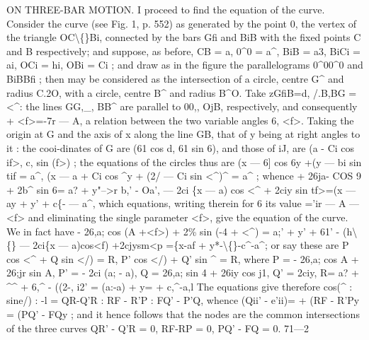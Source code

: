 \documentclass[12pt,a4paper]{article}
\begin{document}
ON THREE-BAR MOTION.
I proceed
to
find the equation of the
curve.
Consider
the
curve
(see
Fig.
1,
p. 552) as
generated by the point
0,
the vertex
of
the
triangle
OC\textbackslash\{\}Bi, connected by the
bars
Gfi and BiB with
the
fixed points C and B
respectively;
and
suppose,
as
before, CB = a,
0\textasciicircum{}0 = a\textasciicircum{},
BiB = a3,
BiCi = ai,
OCi = hi,
OBi = Ci
;
and
draw
as
in
the
figure
the
parallelograms
0\textasciicircum{}00\textasciicircum{}0
and BiBBfi
;
then
may
be
considered
as
the
intersection
of
a
circle,
centre
G\textasciicircum{}
and
radius
C.2O,
with
a
circle,
centre
B\textasciicircum{}
and
radius
B\textasciicircum{}O.
Take
zGfiB=d,
/.B,BG = <\textasciicircum{}:
the
lines
GG,\_,
BB\textasciicircum{}
are
parallel
to 00,,
OjB,
respectively, and consequently
+ <f>=-7r --- A, a
relation between
the two variable angles
6,
<f>.
Taking
the
origin
at G
and
the
axis
of
x
along
the
line
GB,
that
of y
being
at
right
angles
to
it
:
the
cooi-dinates
of
G\guillemotleft{}
are
(61 cos d,
61 sin 6),
and
those
of
iJ,
are (a - Ci cos
if>,
c, sin (f>)
;
the equations of the
circles thus are
(x --- 6] cos 6y
+(y --- bi sin tif = a\textasciicircum{},
(x --- a + Ci cos \textasciicircum{}y + (2/ --- Ci sin <\textasciicircum{})\textasciicircum{} = a\textasciicircum{} ;
whence
+ 26ja- COS 9 + 2b\textasciicircum{} sin 6=
a? + y"-->r b,' - Oa',
--- 2ci \{x --- a) cos <\textasciicircum{} + 2ciy sin tf>=(x --- ay + y' + c\{- --- a\textasciicircum{},
which
equations,
writing
therein
for
6
its
value
='ir --- A ---
<f>
and
eliminating
the
single parameter
<f>, give the equation
of the
curve.
We
in
fact have
- 26,a; cos (A +<f>) + 2\% sin (-4 + <\textasciicircum{}) =
a;' + y' + 61' - (h\textbackslash\{\}
--- 2ci\{x --- a)cos<f)
+2cjysm<p
=\{x-af + y*-\textbackslash\{\}-c\textasciicircum{}-a\textasciicircum{};
or say these are
P cos <\textasciicircum{} + Q sin
</) = R,
P' cos
</) + Q' sin \textasciicircum{} = R,
where
P = - 26,a; cos A + 26;jr sin A, P' = - 2ci (a; - a),
Q =
26,a; sin 4 + 26iy cos j1,
Q' =
2ciy,
R=
a? + \textasciicircum{}\textasciicircum{} + 6,\textasciicircum{} - ((2-,
i2' = (a:-a)\guillemotright{} + y= + c,\textasciicircum{}-a,l
The equations give therefore
cos(\textasciicircum{}
:
sine/)
: -l = QR-Q'R
: RF - R'P
: FQ' - P'Q,
whence
(Qii' - e'ii)= + (RF - R'Py = (PQ' - FQy
;
and
it hence
follows
that
the nodes are
the common
intersections
of the
three curves
QR' - Q'R = 0, RF-RP = 0, PQ' - FQ = 0.
71---2
\end{document}
